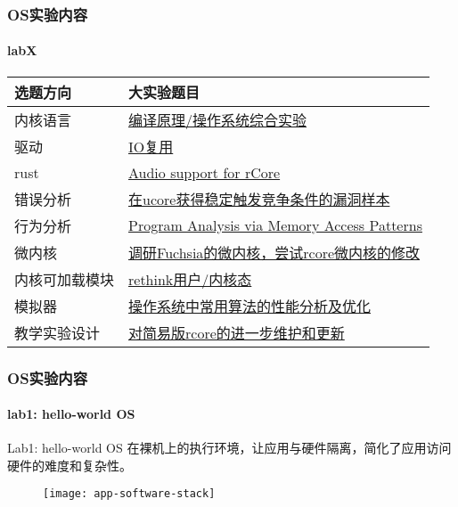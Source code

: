 \begin{frame}
	\frametitle{OS实验内容}
	\framesubtitle{labX}
	
	\begin{longtable}[]{@{}|l|l|@{}}
		\toprule
		选题方向 & 大实验题目\tabularnewline
		\midrule
		\endhead
		内核语言 &
		\href{http://os.cs.tsinghua.edu.cn/oscourse/OsTrain2019/g6}{编译原理/操作系统综合实验}\tabularnewline \hline
		驱动 &
		\href{http://os.cs.tsinghua.edu.cn/oscourse/OsTrain2019/g4}{IO复用}\tabularnewline \hline
		rust &
		\href{http://os.cs.tsinghua.edu.cn/oscourse/OS2019spring/projects/g08}{Audio
			support for rCore}\tabularnewline \hline
		错误分析 &
		\href{http://os.cs.tsinghua.edu.cn/oscourse/OS2019spring/projects/g07}{在ucore获得稳定触发竞争条件的漏洞样本}\tabularnewline \hline
		行为分析 &
		\href{http://os.cs.tsinghua.edu.cn/oscourse/OS2019spring/projects/g09}{Program
			Analysis via Memory Access Patterns}\tabularnewline \hline
		微内核 &
		\href{http://os.cs.tsinghua.edu.cn/oscourse/OsTrain2019/g1}{调研Fuchsia的微内核，尝试rcore微内核的修改}\tabularnewline \hline
		内核可加载模块 &
		\href{http://os.cs.tsinghua.edu.cn/oscourse/OsTrain2019/g5}{rethink用户/内核态}\tabularnewline \hline
		模拟器 &
		\href{http://os.cs.tsinghua.edu.cn/oscourse/OS2019spring/projects/g10}{操作系统中常用算法的性能分析及优化}\tabularnewline \hline
		教学实验设计 &
		\href{http://os.cs.tsinghua.edu.cn/oscourse/OsTrain2019/g7}{对简易版rcore的进一步维护和更新}\tabularnewline \hline
		\bottomrule
	\end{longtable}
	

\end{frame}
\begin{frame}
    \frametitle{OS实验内容}
    \framesubtitle{lab1: hello-world OS}
    \begin{block}{Lab1:  hello-world OS}
        在裸机上的执行环境，让应用与硬件隔离，简化了应用访问硬件的难度和复杂性。
    \end{block}
    
    \begin{figure}
        \centering
        \texttt{[image: app-software-stack]} %
    \end{figure}
    
\end{frame}
